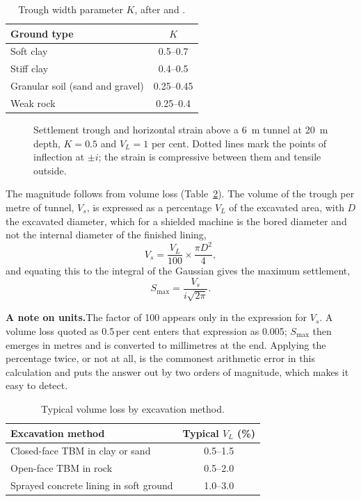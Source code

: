 \begin{table}[htbp]
\caption{Trough width parameter $K$, after \citet{peck1969deep} and \citet{mair1996settlement}.}
\label{tab:k_values}
\centering
\small
\begin{tabular}{lc}
\toprule
\textbf{Ground type} & \textbf{$K$} \\
\midrule
Soft clay & 0.5--0.7 \\
Stiff clay & 0.4--0.5 \\
Granular soil (sand and gravel) & 0.25--0.45 \\
Weak rock & 0.25--0.4 \\
\bottomrule
\end{tabular}
\end{table}

\begin{figure}[htbp]
\centering
{}
\caption{Settlement trough and horizontal strain above a 6~m tunnel at 20~m depth, $K = 0.5$ and $V_L = 1$ per cent. Dotted lines mark the points of inflection at $\pm i$; the strain is compressive between them and tensile outside.}
\label{fig:gaussian-trough}
\end{figure}

The magnitude follows from volume loss (Table~\ref{tab:vl_values}). The volume of the trough per metre of
tunnel, $V_s$, is expressed as a percentage $V_L$ of the excavated area, with
$D$ the excavated diameter, which for a shielded machine is the bored
diameter and not the internal diameter of the finished lining,
\[
V_s = \frac{V_L}{100} \times \frac{\pi D^2}{4},
\]
and equating this to the integral of the Gaussian gives the maximum
settlement,
\[
S_{\max} = \frac{V_s}{i \sqrt{2\pi}} .
\]

\noindent\textbf{A note on units.}\enspace The factor of 100 appears only in the
expression for $V_s$. A volume loss quoted as 0.5\,per cent
enters that expression as 0.005; $S_{\max}$ then emerges in metres and is
converted to millimetres at the end. Applying the percentage twice, or not at
all, is the commonest arithmetic error in this calculation and puts the answer
out by two orders of magnitude, which makes it easy to detect.

\begin{table}[htbp]
\caption{Typical volume loss by excavation method.}
\label{tab:vl_values}
\centering
\small
\begin{tabular}{lc}
\toprule
\textbf{Excavation method} & \textbf{Typical $V_L$ (\%)} \\
\midrule
Closed-face TBM in clay or sand & 0.5--1.5 \\
Open-face TBM in rock & 0.5--2.0 \\
Sprayed concrete lining in soft ground & 1.0--3.0 \\
\bottomrule
\end{tabular}
\end{table}

